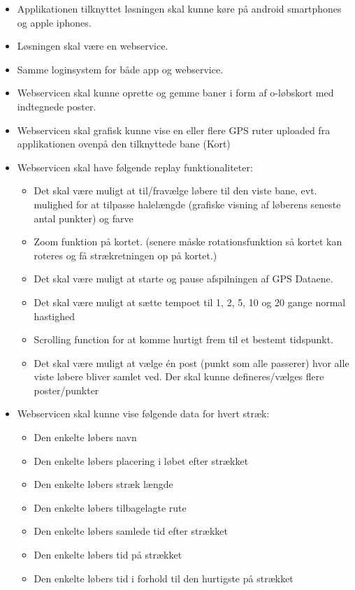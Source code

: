 \begin{itemize}
	\item Applikationen tilknyttet løsningen skal kunne køre på android smartphones og apple iphones.
	\item Løsningen skal være en webservice.
	\item Samme loginsystem for både app og webservice.
	\item Webservicen skal kunne oprette og gemme baner i form af o-løbskort med indtegnede poster.
	\item Webservicen skal grafisk kunne vise en eller flere GPS ruter uploaded fra applikationen ovenpå den tilknyttede bane (Kort)
	\item Webservicen skal have følgende replay funktionaliteter:
	\begin{itemize}
		\item Det skal være muligt at til/fravælge løbere til den viste bane, evt. mulighed for at tilpasse halelængde (grafiske visning af løberens seneste antal punkter) og farve
		\item Zoom funktion på kortet. (senere måske rotationsfunktion så kortet kan roteres og få strækretningen op på kortet.)
		\item Det skal være muligt at starte og pause afspilningen af GPS Dataene.
		\item Det skal være muligt at sætte tempoet til 1, 2, 5, 10 og 20 gange normal hastighed
		\item Scrolling function for at komme hurtigt frem til et bestemt tidspunkt.
		\item Det skal være muligt at vælge én post (punkt som alle passerer) hvor alle viste løbere bliver samlet ved. Der skal kunne defineres/vælges flere poster/punkter
	\end{itemize}
	\item Webservicen skal kunne vise følgende data for hvert stræk:
	\begin{itemize}
		\item Den enkelte løbers navn
		\item Den enkelte løbers placering i løbet efter strækket
		\item Den enkelte løbers stræk længde
		\item Den enkelte løbers tilbagelagte rute
		\item Den enkelte løbers samlede tid efter strækket
		\item Den enkelte løbers tid på strækket
		\item Den enkelte løbers tid i forhold til den hurtigste på strækket

\end{itemize}
\end{itemize}
